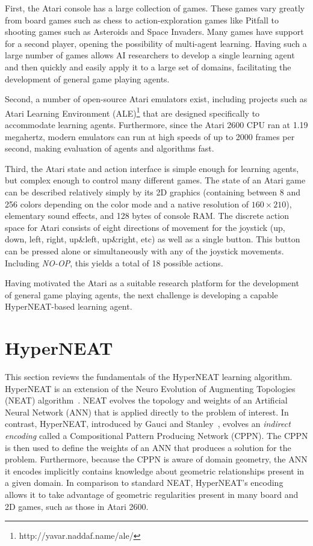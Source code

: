 \documentclass{sig-alternate}
\begin{document}
First, the Atari console has a large collection of games. These games vary greatly from board games such as chess to action-exploration games like Pitfall to shooting games such as Asteroids and Space Invaders. Many games have support for a second player, opening the possibility of multi-agent learning. Having such a large number of games allows AI researchers to develop a single learning agent and then quickly and easily apply it to a large set of domains, facilitating the development of general game playing agents.

Second, a number of open-source Atari emulators exist, including projects such as Atari Learning Environment (ALE)\footnote{http://yavar.naddaf.name/ale/} that are designed specifically to accommodate learning agents. Furthermore, since the Atari 2600 CPU ran at 1.19 megahertz, modern emulators can run at high speeds of up to 2000 frames per second, making evaluation of agents and algorithms fast.

Third, the Atari state and action interface is simple enough for learning agents, but complex enough to control many different games. The state of an Atari game can be described relatively simply by its 2D graphics (containing between 8 and 256 colors depending on the color mode and a native resolution of $160\times 210$), elementary sound effects, and 128 bytes of console RAM. The discrete action space for Atari consists of eight directions of movement for the joystick (up, down, left, right, up\&left, up\&right, etc) as well as a single button. This button can be pressed alone or simultaneously with any of the joystick movements. Including \textit{NO-OP}, this yields a total of 18 possible actions.

Having motivated the Atari as a suitable research platform for the development of general game playing agents, the next challenge is developing a capable HyperNEAT-based learning agent.

\section{HyperNEAT}
\label{sec:hyperneat}
This section reviews the fundamentals of the HyperNEAT learning algorithm. HyperNEAT is an extension of the Neuro Evolution of Augmenting Topologies (NEAT) algorithm~\cite{stanley02}. NEAT evolves the topology and weights of an Artificial Neural Network (ANN) that is applied directly to the problem of interest. In contrast, HyperNEAT, introduced by Gauci and Stanley~\cite{gauci08}, evolves an \emph{indirect encoding} called a Compositional Pattern Producing Network (CPPN). The CPPN is then used to define the weights of an ANN that produces a solution for the problem. Furthermore, because the CPPN is aware of domain geometry, the ANN it encodes implicitly contains knowledge about geometric relationships present in a given domain. In comparison to standard NEAT, HyperNEAT's encoding allows it to take advantage of geometric regularities present in many board and 2D games, such as those in Atari 2600. 
\end{document}
